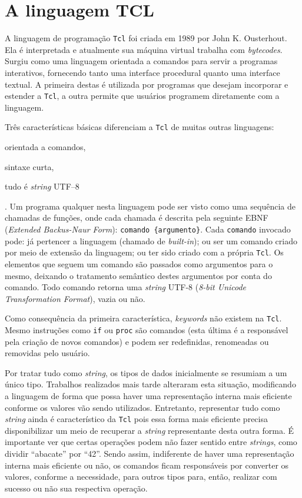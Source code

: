 \chapter{A linguagem TCL}


A linguagem de programação \texttt{Tcl} foi criada em 1989 por John
K. Ousterhout. Ela é interpretada e atualmente sua máquina virtual
trabalha com \textit{bytecodes}. Surgiu como uma linguagem orientada a
comandos para servir a programas interativos, fornecendo tanto uma
interface procedural quanto uma interface textual. A primeira destas é
utilizada por programas que desejam incorporar e estender a
\texttt{Tcl}, a outra permite que usuários programem diretamente com a
linguagem.

Três características básicas diferenciam a \texttt{Tcl} de muitas
outras linguagens: \begin{inparaenum}
\item orientada a comandos, \item sintaxe curta, \item tudo é
  \textit{string} UTF--8\end{inparaenum}. Um programa qualquer nesta
linguagem pode ser visto como uma sequência de chamadas de funções, onde
cada chamada é descrita pela seguinte EBNF (\textit{Extended Backus-Naur Form}):
\verb!comando {argumento}!. Cada \verb!comando! invocado pode: já
pertencer a linguagem (chamado de \textit{built-in}); ou
ser um comando criado por meio de extensão da linguagem; ou ter
sido criado com a própria \texttt{Tcl}. Os elementos que seguem um comando
são passados como argumentos para o mesmo, deixando o tratamento
semântico destes argumentos por conta do comando. Todo comando retorna uma
\textit{string} UTF-8 (\textit{8-bit Unicode Transformation Format}),
vazia ou não.

Como consequência da primeira característica, \textit{keywords} não
existem na \texttt{Tcl}. Mesmo instruções como
\verb!if! ou \verb!proc! são comandos (esta última é a responsável
pela criação de novos comandos) e podem ser redefinidas, renomeadas ou
removidas pelo usuário.

Por tratar tudo como \textit{string}, os tipos de dados inicialmente
se resumiam a um único tipo. Trabalhos realizados mais tarde
\cite{sah_tc}\cite{tcl_bytecode} alteraram esta situação, modificando
a linguagem de forma que possa
haver uma representação interna mais eficiente conforme os valores vão
sendo utilizados. Entretanto, representar tudo como \textit{string} ainda
é característico da \texttt{Tcl} pois essa forma mais eficiente
precisa disponibilizar um meio de recuperar a \textit{string}
representante desta outra forma. É importante ver que certas
operações podem não fazer sentido entre \textit{strings}, como dividir
``abacate'' por ``42''. Sendo assim, indiferente de haver uma
representação interna mais eficiente ou não, os comandos ficam responsáveis
por converter os valores, conforme a necessidade, para outros
tipos para, então, realizar com sucesso ou não sua respectiva operação.

